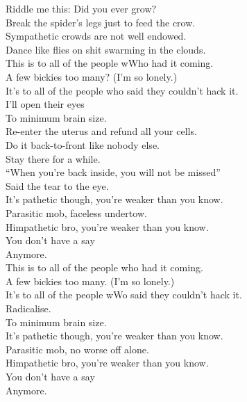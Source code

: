 Riddle me this: Did you ever grow? \\
Break the spider's legs just to feed the crow. \\
Sympathetic crowds are not well endowed. \\
Dance like flies on shit swarming in the clouds. \\

This is to all of the people wWho had it coming. \\
A few bickies too many? (I'm so lonely.) \\
It's to all of the people who said they couldn't hack it. \\
I'll open their eyes \\

To minimum brain size. \\

Re-enter the uterus and refund all your cells. \\
Do it back-to-front like nobody else. \\
Stay there for a while. \\
``When you're back inside, you will not be missed'' \\
Said the tear to the eye. \\

It's pathetic though, you're weaker than you know. \\
Parasitic mob, faceless undertow. \\
Himpathetic bro, you're weaker than you know. \\
You don't have a say \\
Anymore. \\

This is to all of the people who had it coming. \\
A few bickies too many. (I'm so lonely.) \\
It's to all of the people wWo said they couldn't hack it. \\
Radicalise. \\

To minimum brain size. \\

It's pathetic though, you're weaker than you know. \\
Parasitic mob, no worse off alone. \\
Himpathetic bro, you're weaker than you know. \\
You don't have a say \\
Anymore. \\

